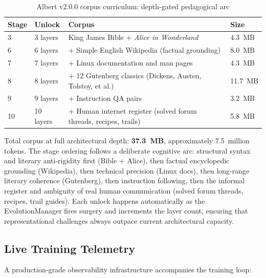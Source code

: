\documentclass[journal,10pt,twocolumn]{IEEEtran}
\begin{document}
\begin{table}[h]
\centering
\small
\caption{Albert v2.0.0 corpus curriculum: depth-gated pedagogical arc}
\label{tab:corpus}
\begin{tabular}{p{0.7cm}p{1.3cm}p{4.3cm}p{0.8cm}}
\toprule
Stage & Unlock & Corpus & Size \\
\midrule
3 & 3 layers & King James Bible + \emph{Alice in Wonderland} & 4.3~MB \\
6 & 6 layers & + Simple English Wikipedia (factual grounding) & 8.0~MB \\
7 & 7 layers & + Linux documentation and man pages & 4.3~MB \\
8 & 8 layers & + 12 Gutenberg classics (Dickens, Austen, Tolstoy, et al.) & 11.7~MB \\
9 & 9 layers & + Instruction QA pairs & 3.2~MB \\
10 & 10 layers & + Human internet register (solved forum threads, recipes, trails) & 5.8~MB \\
\bottomrule
\end{tabular}
\end{table}

\noindent Total corpus at full architectural depth: \textbf{37.3~MB},
approximately 7.5~million tokens. The stage ordering follows a deliberate
cognitive arc: structural syntax and literary anti-rigidity first (Bible +
Alice), then factual encyclopedic grounding (Wikipedia), then technical
precision (Linux docs), then long-range literary coherence (Gutenberg), then
instruction following, then the informal register and ambiguity of real human
communication (solved forum threads, recipes, trail guides). Each unlock
happens automatically as the EvolutionManager fires surgery and increments
the layer count, ensuring that representational challenges always outpace
current architectural capacity.

\subsection{Live Training Telemetry}

A production-grade observability infrastructure accompanies the training loop:
\end{document}

